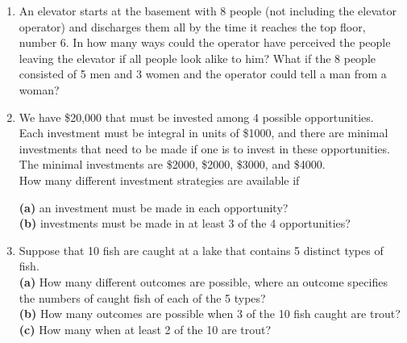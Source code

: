 \documentclass{article}
\theoremstyle{remark}
\begin{document}
\begin{enumerate}
        \item An elevator starts at the basement with 8 people (not including the elevator operator) 
        and discharges them all by the time it reaches the top floor, number 6. 
        In how many ways could the operator have perceived the people leaving the elevator if all people look alike to him? 
        What if the 8 people consisted of 5 men and 3 women and the operator could tell a man from a woman?
        
        \item We have \$20,000 that must be invested among 4 possible opportunities.\\
        Each investment must be integral in units of \$1000, and there are minimal investments that need to be made if one is to invest in these opportunities.\\
        The minimal investments are \$2000, \$2000, \$3000, and \$4000.\\
        How many different investment strategies are available if  
        
        \textbf{(a)} an investment must be made in each opportunity?\\
        
        \textbf{(b)} investments must be made in at least 3 of the 4 opportunities?\\
        
        \item Suppose that 10 fish are caught at a lake that contains 5 distinct types of fish.\\
        
        \textbf{(a)} How many different outcomes are possible, where an outcome specifies the numbers of caught fish of each of the 5 types?\\
        
        \textbf{(b)} How many outcomes are possible when 3 of the 10 fish caught are trout?\\
        
        \textbf{(c)} How many when at least 2 of the 10 are trout?\\


\end{enumerate}
\end{document}
